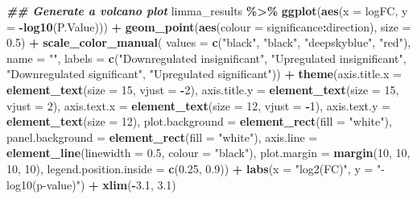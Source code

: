 \documentclass[9pt,a4paper,]{extarticle}
\newenvironment{Shaded}{\begin{snugshade}}{\end{snugshade}}
\newcommand{\AttributeTok}[1]{\textcolor[rgb]{0.13,0.29,0.53}{#1}}
\newcommand{\DecValTok}[1]{\textcolor[rgb]{0.00,0.00,0.81}{#1}}
\newcommand{\DocumentationTok}[1]{\textcolor[rgb]{0.56,0.35,0.01}{\textbf{\textit{#1}}}}
\newcommand{\FloatTok}[1]{\textcolor[rgb]{0.00,0.00,0.81}{#1}}
\newcommand{\FunctionTok}[1]{\textcolor[rgb]{0.13,0.29,0.53}{\textbf{#1}}}
\newcommand{\NormalTok}[1]{#1}
\newcommand{\SpecialCharTok}[1]{\textcolor[rgb]{0.81,0.36,0.00}{\textbf{#1}}}
\newcommand{\StringTok}[1]{\textcolor[rgb]{0.31,0.60,0.02}{#1}}
\begin{document}
\begin{Shaded}
\begin{Highlighting}[]
\DocumentationTok{\#\# Generate a volcano plot}
\NormalTok{limma\_results }\SpecialCharTok{\%\textgreater{}\%}
  \FunctionTok{ggplot}\NormalTok{(}\FunctionTok{aes}\NormalTok{(}\AttributeTok{x =}\NormalTok{ logFC, }\AttributeTok{y =} \SpecialCharTok{{-}}\FunctionTok{log10}\NormalTok{(P.Value))) }\SpecialCharTok{+}
  \FunctionTok{geom\_point}\NormalTok{(}\FunctionTok{aes}\NormalTok{(}\AttributeTok{colour =}\NormalTok{ significance}\SpecialCharTok{:}\NormalTok{direction), }\AttributeTok{size =} \FloatTok{0.5}\NormalTok{) }\SpecialCharTok{+}
  \FunctionTok{scale\_color\_manual}\NormalTok{(}
    \AttributeTok{values =} \FunctionTok{c}\NormalTok{(}\StringTok{"black"}\NormalTok{, }\StringTok{"black"}\NormalTok{, }\StringTok{"deepskyblue"}\NormalTok{, }\StringTok{"red"}\NormalTok{), }\AttributeTok{name =} \StringTok{""}\NormalTok{,}
    \AttributeTok{labels =} \FunctionTok{c}\NormalTok{(}\StringTok{"Downregulated insignificant"}\NormalTok{,}
               \StringTok{"Upregulated insignificant"}\NormalTok{,}
               \StringTok{"Downregulated significant"}\NormalTok{,}
               \StringTok{"Upregulated significant"}\NormalTok{)) }\SpecialCharTok{+}
  \FunctionTok{theme}\NormalTok{(}\AttributeTok{axis.title.x =} \FunctionTok{element\_text}\NormalTok{(}\AttributeTok{size =} \DecValTok{15}\NormalTok{, }\AttributeTok{vjust =} \SpecialCharTok{{-}}\DecValTok{2}\NormalTok{),}
        \AttributeTok{axis.title.y =} \FunctionTok{element\_text}\NormalTok{(}\AttributeTok{size =} \DecValTok{15}\NormalTok{, }\AttributeTok{vjust =} \DecValTok{2}\NormalTok{),}
        \AttributeTok{axis.text.x =} \FunctionTok{element\_text}\NormalTok{(}\AttributeTok{size =} \DecValTok{12}\NormalTok{, }\AttributeTok{vjust =} \SpecialCharTok{{-}}\DecValTok{1}\NormalTok{),}
        \AttributeTok{axis.text.y =} \FunctionTok{element\_text}\NormalTok{(}\AttributeTok{size =} \DecValTok{12}\NormalTok{),}
        \AttributeTok{plot.background =} \FunctionTok{element\_rect}\NormalTok{(}\AttributeTok{fill =} \StringTok{"white"}\NormalTok{),}
        \AttributeTok{panel.background =} \FunctionTok{element\_rect}\NormalTok{(}\AttributeTok{fill =} \StringTok{"white"}\NormalTok{),}
        \AttributeTok{axis.line =} \FunctionTok{element\_line}\NormalTok{(}\AttributeTok{linewidth =} \FloatTok{0.5}\NormalTok{, }\AttributeTok{colour =} \StringTok{"black"}\NormalTok{),}
        \AttributeTok{plot.margin =} \FunctionTok{margin}\NormalTok{(}\DecValTok{10}\NormalTok{, }\DecValTok{10}\NormalTok{, }\DecValTok{10}\NormalTok{, }\DecValTok{10}\NormalTok{),}
        \AttributeTok{legend.position.inside =} \FunctionTok{c}\NormalTok{(}\FloatTok{0.25}\NormalTok{, }\FloatTok{0.9}\NormalTok{)) }\SpecialCharTok{+}
  \FunctionTok{labs}\NormalTok{(}\AttributeTok{x =} \StringTok{"log2(FC)"}\NormalTok{, }\AttributeTok{y =} \StringTok{"{-}log10(p{-}value)"}\NormalTok{) }\SpecialCharTok{+}
  \FunctionTok{xlim}\NormalTok{(}\SpecialCharTok{{-}}\FloatTok{3.1}\NormalTok{, }\FloatTok{3.1}\NormalTok{)}
\end{Highlighting}
\end{Shaded}
\end{document}
